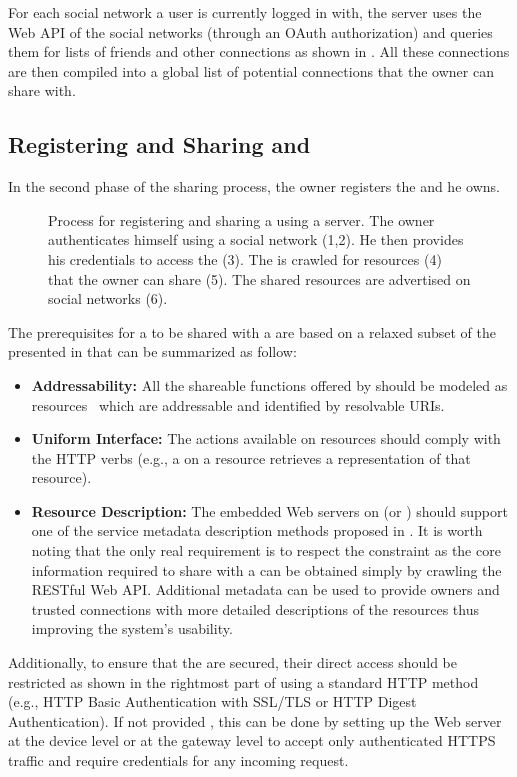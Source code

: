 For each social network a user is currently logged in with, the \sac{} server uses the Web API of the social networks (through an OAuth authorization) and queries them for lists of friends and other connections as shown in . All these connections are then compiled into a global list of potential connections that the owner can share with.


\subsection{Registering and Sharing \stsBig{} and \sgs{}}
In the second phase of the sharing process, the owner registers the \sts{} and \sgs{} he owns.
\begin{figure}
\caption{Process for registering and sharing a \st{} using a \sac{} server. The owner authenticates himself using a social network (1,2). He then provides his credentials to access the \st{} (3). The \st{} is crawled for resources (4) that the owner can share (5). The shared resources are advertised on social networks (6).}
\label{fig:sacRegisterShare}
\end{figure}
The prerequisites for a \st{} to be shared with a \sac{} are based on a relaxed subset of the \devLayer{} presented in  that can be summarized as follow:
\begin{itemize}
 \item \textbf{Addressability:} All the shareable functions offered by \sts{} should be modeled as resources~\cite{Fielding2000} which are addressable and identified by resolvable URIs.
 \item \textbf{Uniform Interface:} The actions available on resources should comply with the HTTP verbs (e.g., a  on a resource retrieves a representation of that resource).
 \item \textbf{Resource Description:} The embedded Web servers on \sts{} (or \sg{}) should support one of the service metadata description methods proposed in . It is worth noting that the only real requirement is to respect the  constraint as the core information required to share \sts{} with a \sac{} can be obtained simply by crawling the RESTful Web API. Additional metadata can be used to provide owners and trusted connections with more detailed descriptions of the resources thus improving the system's usability.
 \end{itemize}
Additionally, to ensure that the \sts{} are secured, their direct access should be restricted as shown in the rightmost part of  using a standard HTTP method (e.g., HTTP Basic Authentication with SSL/TLS or HTTP Digest Authentication). If not provided , this can be done by setting up the Web server at the device level or at the gateway level to accept only authenticated HTTPS traffic and require credentials for any incoming request.  

